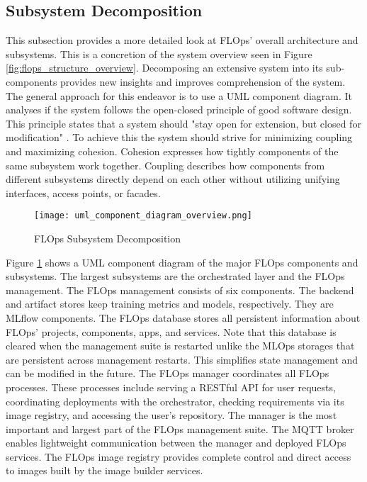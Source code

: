\subsection{Subsystem Decomposition} \label{subsection:subsystem_decomposition}

This subsection provides a more detailed look at FLOps' overall architecture and subsystems.
This is a concretion of the system overview seen in Figure \ref{fig:flops_structure_overview}.
Decomposing an extensive system into its sub-components provides new insights and improves comprehension of the system.
The general approach for this endeavor is to use a UML component diagram.
It analyses if the system follows the open-closed principle of good software design.
This principle states that a system should "stay open for extension, but closed for modification" \cite{book:bruegge}.
To achieve this the system should strive for minimizing coupling and maximizing cohesion.
Cohesion expresses how tightly components of the same subsystem work together.
Coupling describes how components from different subsystems directly depend on each other without utilizing unifying interfaces, access points, or facades.

\begin{figure}[p]
    \begin{adjustwidth}{-0.175\paperwidth}{-0.175\paperwidth}
        \centering
        \texttt{[image: uml\_component\_diagram\_overview.png]}
        \caption{FLOps Subsystem Decomposition}
        \label{fig:component_diagram_overview}
    \end{adjustwidth}
\end{figure}

Figure \ref{fig:component_diagram_overview} shows a UML component diagram of the major FLOps components and subsystems.
The largest subsystems are the orchestrated layer and the FLOps management.
The FLOps management consists of six components.
The backend and artifact stores keep training metrics and models, respectively.
They are MLflow components.
The FLOps database stores all persistent information about FLOps' projects, components, apps, and services.
Note that this database is cleared when the management suite is restarted unlike the MLOps storages that are persistent across management restarts.
This simplifies state management and can be modified in the future.
The FLOps manager coordinates all FLOps processes.
These processes include serving a RESTful API for user requests, coordinating deployments with the orchestrator, checking requirements via its image registry, and accessing the user's repository.
The manager is the most important and largest part of the FLOps management suite.
The MQTT broker enables lightweight communication between the manager and deployed FLOps services.
The FLOps image registry provides complete control and direct access to images built by the image builder services.

